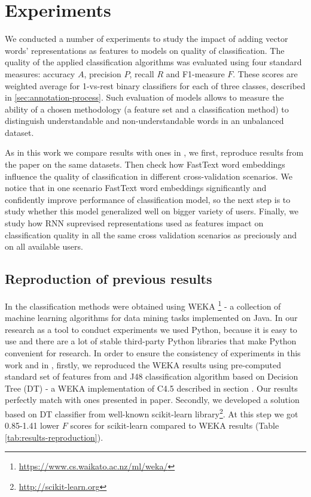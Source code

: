 \chapter{Experiments}
\label{ch:experiments}

We conducted a number of experiments to study the impact of adding vector words' representations as features to models on quality of classification. The quality of the applied classification algorithms was evaluated using four standard measures: accuracy $A$, precision $P$, recall $R$ and F1-measure $F$. These scores are weighted average for 1-vs-rest binary classifiers for each of three classes, described in \ref{sec:annotation-process}. Such evaluation of models allows to measure the ability of a chosen methodology (a feature set and a classification method) to distinguish understandable and non-understandable words in an unbalanced dataset. 

As in this work we compare results with ones in \cite{Grabar-PITR2014}, we first, reproduce results from the paper on the same datasets. Then check how FastText word embeddings influence the quality of classification in different cross-validation scenarios. We notice that in one scenario FastText word embeddings significantly and confidently improve performance of classification model, so the next step is to study whether this model generalized well on bigger variety of users. Finally, we study how RNN suprevised representations used as features impact on classification quality in all the same cross validation scenarios as preciously and on all available users.

\section{Reproduction of previous results}

In \citep{Grabar-PITR2014} the classification methods were obtained using WEKA \footnote{\url{https://www.cs.waikato.ac.nz/ml/weka/}} - a collection of machine learning algorithms for data mining tasks implemented on Java. In our research as a tool to conduct experiments we used Python, because it is easy to use and there are a lot of stable third-party Python libraries that make Python convenient for research. In order to ensure the consistency of experiments in this work and in \citep{Grabar-PITR2014}, firstly, we reproduced the WEKA results using pre-computed standard set of features from \citep{Grabar-PITR2014} and J48 classification algorithm based on Decision Tree (DT) - a WEKA implementation of C4.5 described in section \citep{Quinlan1993}. Our results perfectly match with ones presented in paper. Secondly, we developed a solution based on DT classifier from well-known scikit-learn library\footnote{\url{http://scikit-learn.org}}. At this step we got 0.85-1.41 lower $F$ scores for scikit-learn compared to WEKA results (Table \ref{tab:results-reproduction}).

